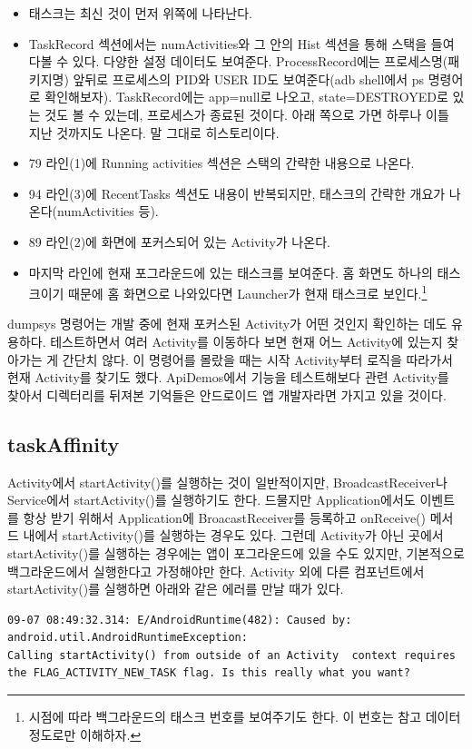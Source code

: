 \begin{itemize}
\item 태스크는 최신 것이 먼저 위쪽에 나타난다.
\item TaskRecord 섹션에서는 numActivities와 그 안의 Hist 섹션을 통해 스택을 들여다볼 수 있다. 다양한 설정 데이터도 보여준다. 
ProcessRecord에는 프로세스명(패키지명) 앞뒤로 프로세스의 PID와 USER ID도 보여준다(adb shell에서 ps 명령어로 확인해보자).
TaskRecord에는 app=null로 나오고, state=DESTROYED로 있는 것도 볼 수 있는데, 프로세스가 종료된 것이다. 
아래 쪽으로 가면 하루나 이틀 지난 것까지도 나온다. 말 그대로 히스토리이다. 
\item 79 라인(1)에 Running activities 섹션은 스택의 간략한 내용으로 나온다.
\item 94 라인(3)에 RecentTasks 섹션도 내용이 반복되지만, 태스크의 간략한 개요가 나온다(numActivities 등).
\item 89 라인(2)에 화면에 포커스되어 있는 Activity가 나온다.
\item 마지막 라인에 현재 포그라운드에 있는 태스크를 보여준다. 홈 화면도 하나의 태스크이기 때문에 홈 화면으로 나와있다면 Launcher가 현재 태스크로 보인다.\footnote{시점에 따라 백그라운드의 태스크 번호를 보여주기도 한다. 이 번호는 참고 데이터 정도로만 이해하자.}
\end{itemize}
dumpsys 명령어는 개발 중에 현재 포커스된 Activity가 어떤 것인지 확인하는 데도 유용하다.
테스트하면서 여러 Activity를 이동하다 보면 현재 어느 Activity에 있는지 찾아가는 게 간단치 않다.
이 명령어를 몰랐을 때는 시작 Activity부터 로직을 따라가서 현재 Activity를 찾기도 했다. ApiDemos에서 기능을 테스트해보다 관련 Activity를 찾아서 디렉터리를 뒤져본 기억들은 안드로이드 앱 개발자라면 가지고 있을 것이다.

\subsection{taskAffinity}
Activity에서 startActivity()를 실행하는 것이 일반적이지만, BroadcastReceiver나 Service에서 startActivity()를 실행하기도 한다. 
드물지만 Application에서도 이벤트를 항상 받기 위해서 Application에 BroacastReceiver를 등록하고 onReceive() 메서드 내에서 startActivity()를 실행하는 경우도 있다.
그런데 Activity가 아닌 곳에서 startActivity()를 실행하는 경우에는 앱이 포그라운드에 있을 수도 있지만, 기본적으로 백그라운드에서 실행한다고 가정해야만 한다. 
Activity 외에 다른 컴포넌트에서 startActivity()를 실행하면 아래와 같은 에러를 만날 때가 있다.
\begin{lstlisting}[frame=single]
09-07 08:49:32.314: E/AndroidRuntime(482): Caused by: android.util.AndroidRuntimeException: 
Calling startActivity() from outside of an Activity  context requires 
the FLAG_ACTIVITY_NEW_TASK flag. Is this really what you want?
\end{lstlisting}

